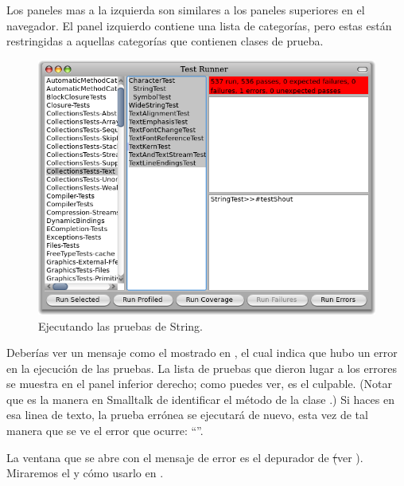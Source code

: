\documentclass[a4paper,10pt,twoside]{book}
\begin{document}
Los paneles mas a la izquierda son similares a los paneles superiores en el navegador. El panel izquierdo contiene una lista de categor\'ias, pero estas est\'an restringidas a aquellas categor\'ias que contienen clases de prueba.


\begin{figure}[hbt]
\centerline {\includegraphics[width=\textwidth]{testRunnerOnStringTest}}
\caption{Ejecutando las pruebas de String.
}
\end{figure}

Deber\'ias ver un mensaje como el mostrado en , el cual indica que hubo un error en la ejecuci\'on de las pruebas. La lista de pruebas que dieron lugar a los errores se muestra en el panel inferior derecho; como puedes ver,  es el culpable.
(Notar que  es la manera en Smalltalk de identificar el m\'etodo  de la clase .)
Si haces \click en esa linea de texto, la prueba err\'onea se ejecutar\'a de nuevo, esta vez de tal manera que se ve el error que ocurre: ``''.

La ventana que se abre con el mensaje de error es el depurador de \st (ver ).
Miraremos el  y c\'omo usarlo en .
\end{document}
